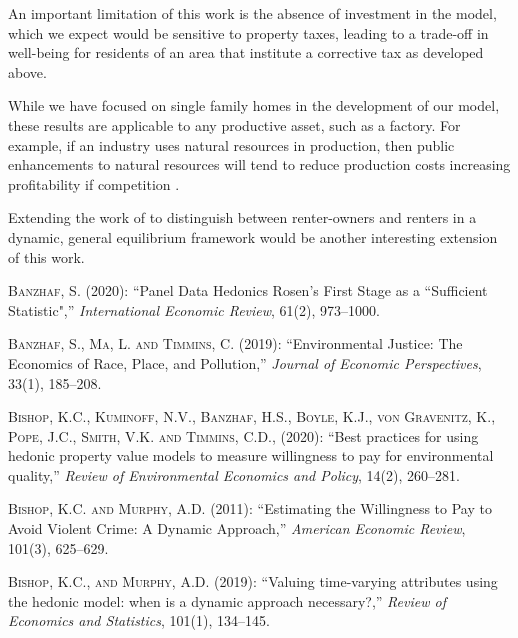 \documentclass[ecta,nameyear,draft]{econsocart}
\theoremstyle{plain}
\theoremstyle{remark}
\begin{document}
An important limitation of this work is the absence of investment in the model, which we expect would be sensitive to property taxes, leading to a trade-off in well-being for residents of an area that institute a corrective tax as developed above.

While we have focused on single family homes in the development of our model, these results are applicable to any productive asset, such as a factory. For example, if an industry uses natural resources in production, then public enhancements to natural resources will tend to reduce production costs increasing profitability if competition . 

Extending the work of \cite{kanemoto88} to distinguish between renter-owners and renters in a dynamic, general equilibrium framework would be another interesting extension of this work.
\begin{thebibliography}{}
%


\textsc{Banzhaf, S.} (2020):
``Panel Data Hedonics Rosen’s First Stage as a “Sufficient
Statistic",''
\textit{International Economic Review}, 61(2), 973--1000.
\endbibitem


\textsc{Banzhaf, S., Ma, L. and Timmins, C.} (2019):
``Environmental Justice: The Economics of Race, Place, and Pollution,''
\textit{Journal of Economic Perspectives}, 33(1), 185--208.
\endbibitem

\textsc{Bishop, K.C., Kuminoff, N.V., Banzhaf, H.S., Boyle, K.J., von Gravenitz, K., Pope, J.C., Smith, V.K. and Timmins, C.D., } (2020):
``Best practices for using hedonic property value models to measure willingness to pay for environmental quality,''
\textit{Review of Environmental Economics and Policy}, 14(2), 260--281.
\endbibitem

\textsc{Bishop, K.C. and Murphy, A.D.} (2011):
``Estimating the Willingness to Pay to Avoid Violent Crime: A Dynamic Approach,''
\textit{American Economic Review}, 101(3), 625--629.
\endbibitem

\textsc{Bishop, K.C., and Murphy, A.D.} (2019):
``Valuing time-varying attributes using the hedonic model: when is a dynamic approach necessary?,''
\textit{Review of Economics and Statistics}, 101(1), 134--145.
\endbibitem


\end{thebibliography}
\end{document}
